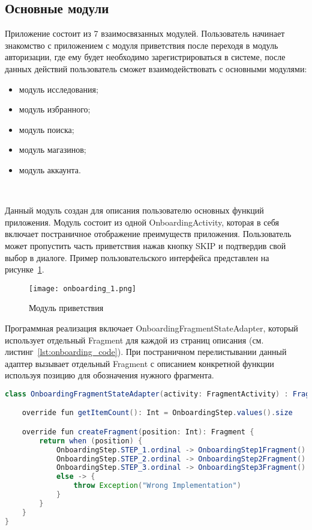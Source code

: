 \subsection{Основные модули}

Приложение состоит из 7 взаимосвязанных модулей. Пользователь начинает знакомство с приложением с модуля приветствия после переходя в модуль авторизации, где ему будет необходимо зарегистрироваться в системе, после данных действий пользователь сможет взаимодействовать с основными модулями:

\begin{itemize}
  \item модуль исследования;
  \item модуль избранного;
  \item модуль поиска;
  \item модуль магазинов;
  \item модуль аккаунта.
\end{itemize}

~\par
Данный модуль создан для описания пользователю основных функций приложения. Модуль состоит из одной OnboardingActivity, которая в себя включает постраничное отображение преимуществ приложения. Пользователь может пропустить часть приветствия нажав кнопку SKIP и подтвердив свой выбор в диалоге. Пример пользовательского интерфейса представлен на рисунке~\ref{fig:arch:onboarding_1}.

\begin{figure}[H]
 \centering
   \texttt{[image: onboarding\_1.png]} 
   \caption{Модуль приветствия}
   \label{fig:arch:onboarding_1}
\end{figure}

Программная реализация включает OnboardingFragmentStateAdapter, который использует отдельный Fragment для каждой из страниц описания (см. листинг~\ref{lst:onboarding_code}). При постраничном перелистывании данный адаптер вызывает отдельный Fragment с описанием конкретной функции используя позицию для обозначения нужного фрагмента.


\begin{lstlisting}[language=Java,label={lst:onboarding_code},caption={OnboardingFragmentStateAdapter}]
class OnboardingFragmentStateAdapter(activity: FragmentActivity) : FragmentStateAdapter(activity) {

    override fun getItemCount(): Int = OnboardingStep.values().size

    override fun createFragment(position: Int): Fragment {
        return when (position) {
            OnboardingStep.STEP_1.ordinal -> OnboardingStep1Fragment()
            OnboardingStep.STEP_2.ordinal -> OnboardingStep2Fragment()
            OnboardingStep.STEP_3.ordinal -> OnboardingStep3Fragment()
            else -> {
                throw Exception("Wrong Implementation")
            }
        }
    }
}
\end{lstlisting}


